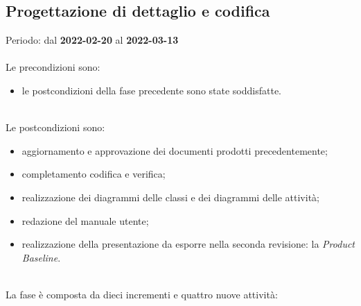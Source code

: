 \subsection{Progettazione di dettaglio e codifica}
Periodo: dal \textbf{2022-02-20} al \textbf{2022-03-13} \mbox{} \\ \mbox{} \\
Le precondizioni sono:
\begin{itemize}
	\item le postcondizioni della fase precedente sono state soddisfatte.
\end{itemize} \mbox{} \\
Le postcondizioni sono:
\begin{itemize}
	\item aggiornamento e approvazione dei documenti prodotti precedentemente;
	\item completamento codifica e verifica;
	\item realizzazione dei diagrammi delle classi e dei diagrammi delle attività;
	\item redazione del manuale utente;
	\item realizzazione della presentazione da esporre nella seconda revisione: la \textit{Product Baseline}\glo{}. 
\end{itemize} \mbox{} \\
La fase è composta da dieci incrementi e quattro nuove attività:
